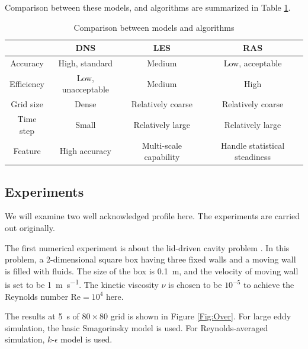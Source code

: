 \documentclass[english, nochinese]{pkupaper}
\begin{document}
Comparison between these models, and algorithms are summarized in Table \ref{Tbl:Comp}.

\begin{table}[htbp]
\centering
\caption{Comparison between models and algorithms}
\label{Tbl:Comp}
\begin{tabular}{|c|c|c|c|}
\hline
& DNS & LES & RAS \\
\hline
Accuracy & High, standard & Medium & Low, acceptable \\
\hline
Efficiency & Low, unacceptable & Medium & High \\
\hline
Grid size & Dense & Relatively coarse & Relatively coarse \\
\hline
Time step & Small & Relatively large & Relatively large \\
\hline
Feature & High accuracy & Multi-scale capability & Handle statistical steadiness \\
\hline
\end{tabular}
\end{table}

\subsection{Experiments}

We will examine two well acknowledged profile here. The experiments are carried out originally.

The first numerical experiment is about the lid-driven cavity problem \parencite{bruneau_2d_2006}. In this problem, a 2-dimensional square box having three fixed walls and a moving wall is filled with fluids. The size of the box is \SI{0.1}{\meter}, and the velocity of moving wall is set to be \SI{1}{\meter\per\second}. The kinetic viscosity $\nu$ is chosen to be $10^{-5}$\Si{\meter\squared\per\second} to achieve the Reynolds number $ \mathrm{Re} = 10^4 $ here.

The results at \SI{5}{s} of $ 80 \times 80 $ grid is shown in Figure \ref{Fig:Over}. For large eddy simulation, the basic Smagorinsky model is used. For Reynolds-averaged simulation, $k$-$\epsilon$ model is used.
\end{document}
